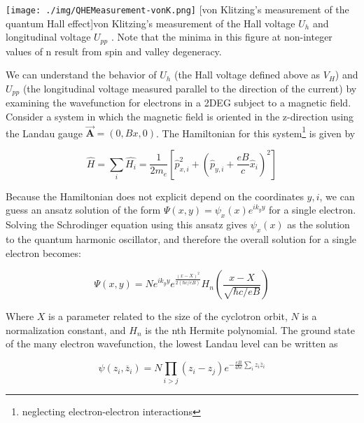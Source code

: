 \begin{centering}
\texttt{[image: ./img/QHEMeasurement-vonK.png]}
  \captionsetup{width=0.75\textwidth}
  [von Klitzing's measurement of the quantum Hall effect]{von Klitzing's measurement of the Hall voltage $U_{h}$ and longitudinal voltage $U_{pp}$ \cite{VonKlitzing1980}. Note that the minima in this figure at non-integer values of n result from spin and valley degeneracy.}
  \label{fig:IQHE1}
\end{centering}

We can understand the behavior of $U_{h}$ (the Hall voltage defined above as $V_{H}$) and $U_{pp}$ (the longitudinal voltage measured parallel to the direction of the current) by examining the wavefunction for electrons in a 2DEG subject to a magnetic field. Consider a system in which the magnetic field is oriented in the z-direction using the Landau gauge $\vec{\mathbf{A}} = (0,Bx,0)$. The Hamiltonian for this system\footnote{neglecting electron-electron interactions} is given by

\begin{equation}
\hat{H} = \sum_{i} \hat{H_{i}} = \frac{1}{2m_{e}} \left[ \hat{p}_{x,i}^{2} + \left(\hat{p}_{y,i} + \frac{eB}{c} \hat{x}_{i} \right)^{2} \right]
\end{equation}

Because the Hamiltonian does not explicit depend on the coordinates $y,i$, we can guess an ansatz solution of the form $\Psi(x,y) = \psi_{x}(x) e^{ik_{y}y}$ for a single electron. Solving the Schrodinger equation using this ansatz gives $\psi_{x}(x)$ as the solution to the quantum harmonic oscillator, and therefore the overall solution for a single electron becomes:

\begin{equation}
\Psi(x,y) = N e^{ik_{y}y}e^{\frac{(x-X)^{2}}{2(\hbar c/eB)}} H_{n} \left(\frac{x-X}{\sqrt{\hbar c/ eB}} \right)
\end{equation}

Where $X$ is a parameter related to the size of the cyclotron orbit, $N$ is a normalization constant, and $H_{n}$ is the nth Hermite polynomial. The ground state of the many electron wavefunction, the lowest Landau level can be written as \cite{Yoshioka2002}

\begin{equation} \label{psi-el}
\psi(z_{i},\overline{z}_{i}) = N \prod_{i > j} (z_{i} - z_{j}) e^{-\frac{eB}{4 \hbar c} \sum_{i} z_{i} \overline{z}_{i}}
\end{equation}


